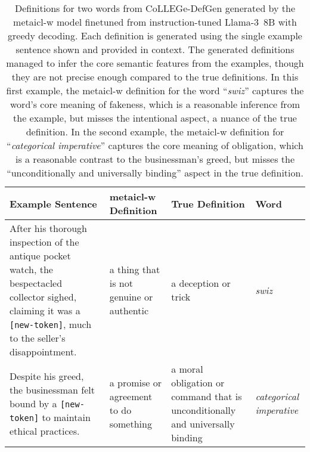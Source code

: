 \documentclass{article}
\begin{document}
\begin{table*}[t]
\small
\begin{center}
\begin{tabular}{p{4.9cm}p{2.9cm}p{4.1cm}p{1.4cm}}
\toprule
\textbf{Example Sentence} & \textbf{\ac{metaicl-w} Definition} & \textbf{True Definition} & \textbf{Word}
\\
\midrule
After his thorough inspection of the antique pocket watch, the bespectacled collector sighed, claiming it was a \texttt{[new-token]}, much to the seller's disappointment.
& a thing that is not genuine or authentic
& a deception or trick
& \textit{swiz}
\\
\midrule
Despite his greed, the businessman felt bound by a \texttt{[new-token]} to maintain ethical practices.
& a promise or agreement to do something
& a moral obligation or command that is unconditionally and universally binding
& \textit{categorical imperative}
\\
\bottomrule
\end{tabular}
\end{center}
\caption{Definitions for two words from CoLLEGe-DefGen generated by the \ac{metaicl-w} model finetuned from instruction-tuned \mbox{Llama-3 8B} with greedy decoding.
Each definition is generated using the single example sentence shown and provided in context.
The generated definitions managed to infer the core semantic features from the examples, though they are not precise enough compared to the true definitions.
In this first example, the \ac{metaicl-w} definition for the word ``\textit{swiz}'' captures the word's core meaning of fakeness, which is a reasonable inference from the example, but misses the intentional aspect, a nuance of the true definition.
In the second example, the \ac{metaicl-w} definition for ``\textit{categorical imperative}'' captures the core meaning of obligation, which is a reasonable contrast to the businessman's greed, but misses the ``unconditionally and universally binding'' aspect in the true definition.
}
\label{tab:defgen-definition}
\end{table*}
\end{document}
